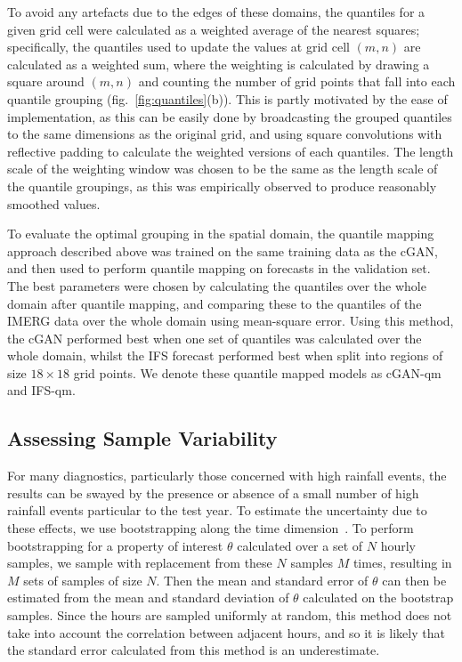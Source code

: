 \documentclass{article}
\begin{document}
To avoid any artefacts due to the edges of these domains, the quantiles for a given grid cell were calculated as a weighted average of the nearest squares; specifically, the quantiles used to update the values at grid cell $(m,n)$ are calculated as a weighted sum, where the weighting is calculated by drawing a square around $(m,n)$ and counting the number of grid points that fall into each quantile grouping (fig.~\ref{fig:quantiles}(b)). This is partly motivated by the ease of implementation, as this can be easily done by broadcasting the grouped quantiles to the same dimensions as the original grid, and using square convolutions with reflective padding to calculate the weighted versions of each quantiles. The length scale of the weighting window was chosen to be the same as the length scale of the quantile groupings, as this was empirically observed to produce reasonably smoothed values.

To evaluate the optimal grouping in the spatial domain, the quantile mapping approach described above was trained on the same training data as the cGAN, and then used to perform quantile mapping on forecasts in the validation set. The best parameters were chosen by calculating the quantiles over the whole domain after quantile mapping, and comparing these to the quantiles of the IMERG data over the whole domain using mean-square error. Using this method, the cGAN performed best when one set of quantiles was calculated over the whole domain, whilst the IFS forecast performed best when split into regions of size $18 \times 18$ grid points. We denote these quantile mapped models as cGAN-qm and IFS-qm.



\subsection{Assessing Sample Variability}
\label{sec:sample_var}


For many diagnostics, particularly those concerned with high rainfall events, the results can be swayed by the presence or absence of a small number of high rainfall events particular to the test year. To estimate the uncertainty due to these effects, we use bootstrapping along the time dimension~\cite{efron_bootstrap_1986}. To perform bootstrapping for a property of interest $\theta$ calculated over a set of $N$ hourly samples, we sample with replacement from these $N$ samples $M$ times, resulting in $M$ sets of samples of size $N$. Then the mean and standard error of $\theta$ can then be estimated from the mean and standard deviation of $\theta$ calculated on the bootstrap samples. Since the hours are sampled uniformly at random, this method does not take into account the correlation between adjacent hours, and so it is likely that the standard error calculated from this method is an underestimate.
\end{document}
